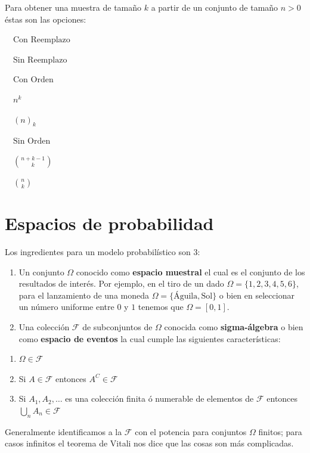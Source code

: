 \documentclass[
]{book}
\providecommand{\tightlist}{%
  \setlength{\itemsep}{0pt}\setlength{\parskip}{0pt}}
\begin{document}
Para obtener una muestra de tamaño \(k\) a partir de un conjunto de tamaño \(n > 0\) éstas son las opciones:

\(\quad \text{Con Reemplazo}\)

\(\quad \text{Sin Reemplazo}\)

\(\quad \text{Con Orden}\)

\(\quad n^k\)

\(\quad (n)_k\)

\(\quad \text{Sin Orden}\)

\(\quad \binom{n+k-1}{k}\)

\(\quad \binom{n}{k}\)

\hypertarget{espacios-de-probabilidad}{%
\section{Espacios de probabilidad}\label{espacios-de-probabilidad}}

Los ingredientes para un modelo probabilístico son \(3\):

\begin{enumerate}
\def\labelenumi{\arabic{enumi}.}
\item
  Un conjunto \(\Omega\) conocido como \textbf{espacio muestral} el cual es el conjunto de los resultados de interés. Por ejemplo, en el tiro de un dado \(\Omega = \{1,2,3,4,5,6\}\), para el lanzamiento de una moneda \(\Omega = \{\text{Águila},\text{Sol}\}\) o bien en seleccionar un número uniforme entre \(0\) y \(1\) tenemos que \(\Omega = [0,1]\).
\item
  Una colección \(\mathcal{F}\) de subconjuntos de \(\Omega\) conocida como \textbf{sigma-álgebra} o bien como \textbf{espacio de eventos} la cual cumple las siguientes características:
\end{enumerate}

\begin{enumerate}
\def\labelenumi{\alph{enumi}.}
\tightlist
\item
  \(\Omega \in \mathcal{F}\)
\item
  Si \(A\in\mathcal{F}\) entonces \(A^C \in \mathcal{F}\)
\item
  Si \(A_1, A_2, \dots\) es una colección finita ó numerable de elementos de \(\mathcal{F}\) entonces \(\bigcup_{n} A_n \in \mathcal{F}\)
\end{enumerate}

Generalmente identificamos a la \(\mathcal{F}\) con el potencia para conjuntos \(\Omega\) finitos; para casos infinitos el teorema de Vitali nos dice que las cosas son más complicadas.
\end{document}
